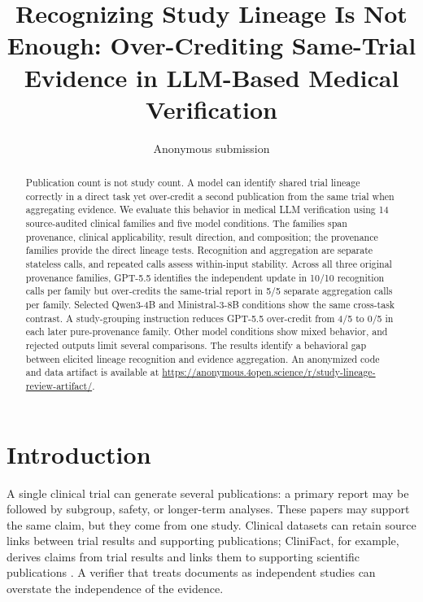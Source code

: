 \documentclass[11pt]{article}
\title{Recognizing Study Lineage Is Not Enough: Over-Crediting Same-Trial Evidence in LLM-Based Medical Verification}
\author{Anonymous submission}
\begin{document}
\maketitle

\begin{abstract} 

Publication count is not study count. A model can identify shared trial lineage correctly in a direct task yet over-credit a second publication from the same trial when aggregating evidence. We evaluate this behavior in medical LLM verification using 14 source-audited clinical families and five model conditions. The families span provenance, clinical applicability, result direction, and composition; the provenance families provide the direct lineage tests. Recognition and aggregation are separate stateless calls, and repeated calls assess within-input stability. Across all three original provenance families, GPT-5.5 identifies the independent update in 10/10 recognition calls per family but over-credits the same-trial report in 5/5 separate aggregation calls per family. Selected Qwen3-4B and Ministral-3-8B conditions show the same cross-task contrast. A study-grouping instruction reduces GPT-5.5 over-credit from 4/5 to 0/5 in each later pure-provenance family. Other model conditions show mixed behavior, and rejected outputs limit several comparisons. The results identify a behavioral gap between elicited lineage recognition and evidence aggregation. An anonymized code and data artifact is available at \url{https://anonymous.4open.science/r/study-lineage-review-artifact/}.

\end{abstract}

\section{Introduction}

A single clinical trial can generate several publications: a primary report may be followed by subgroup, safety, or longer-term analyses. These papers may support the same claim, but they come from one study. Clinical datasets can retain source links between trial results and supporting publications; CliniFact, for example, derives claims from trial results and links them to supporting scientific publications \citep{zhang-etal-2025-dataset}. A verifier that treats documents as independent studies can overstate the independence of the evidence.
\end{document}
